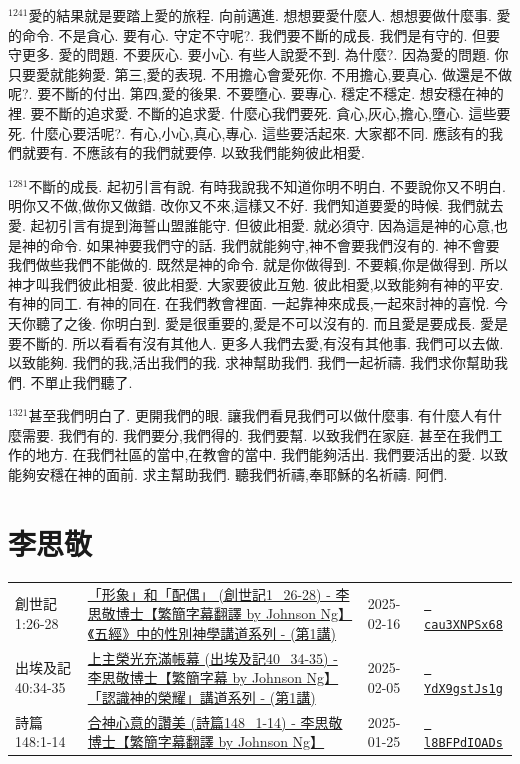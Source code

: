 \documentclass{book}
\begin{document}
$^{1241}$愛的結果就是要踏上愛的旅程.
向前邁進.
想想要愛什麼人.
想想要做什麼事.
愛的命令.
不是貪心.
要有心.
守定不守呢?.
我們要不斷的成長.
我們是有守的.
但要守更多.
愛的問題.
不要灰心.
要小心.
有些人說愛不到.
為什麼?.
因為愛的問題.
你只要愛就能夠愛.
第三,愛的表現.
不用擔心會愛死你.
不用擔心,要真心.
做還是不做呢?.
要不斷的付出.
第四,愛的後果.
不要墮心.
要專心.
穩定不穩定.
想安穩在神的裡.
要不斷的追求愛.
不斷的追求愛.
什麼心我們要死.
貪心,灰心,擔心,墮心.
這些要死.
什麼心要活呢?.
有心,小心,真心,專心.
這些要活起來.
大家都不同.
應該有的我們就要有.
不應該有的我們就要停.
以致我們能夠彼此相愛.

$^{1281}$不斷的成長.
起初引言有說.
有時我說我不知道你明不明白.
不要說你又不明白.
明你又不做,做你又做錯.
改你又不來,這樣又不好.
我們知道要愛的時候.
我們就去愛.
起初引言有提到海誓山盟誰能守.
但彼此相愛.
就必須守.
因為這是神的心意,也是神的命令.
如果神要我們守的話.
我們就能夠守,神不會要我們沒有的.
神不會要我們做些我們不能做的.
既然是神的命令.
就是你做得到.
不要賴,你是做得到.
所以神才叫我們彼此相愛.
彼此相愛.
大家要彼此互勉.
彼此相愛,以致能夠有神的平安.
有神的同工.
有神的同在.
在我們教會裡面.
一起靠神來成長,一起來討神的喜悅.
今天你聽了之後.
你明白到.
愛是很重要的,愛是不可以沒有的.
而且愛是要成長.
愛是要不斷的.
所以看看有沒有其他人.
更多人我們去愛,有沒有其他事.
我們可以去做.
以致能夠.
我們的我,活出我們的我.
求神幫助我們.
我們一起祈禱.
我們求你幫助我們.
不單止我們聽了.

$^{1321}$甚至我們明白了.
更開我們的眼.
讓我們看見我們可以做什麼事.
有什麼人有什麼需要.
我們有的.
我們要分,我們得的.
我們要幫.
以致我們在家庭.
甚至在我們工作的地方.
在我們社區的當中,在教會的當中.
我們能夠活出.
我們要活出的愛.
以致能夠安穩在神的面前.
求主幫助我們.
聽我們祈禱,奉耶穌的名祈禱.
阿們.
\newpage



\chapter{李思敬}\label{ch:preacher2}
\begin{multicols}{3}
\minitoc
\end{multicols}
{ \scriptsize


\begin{xltabular}{\textwidth}{|p{0.15\textwidth} p{0.6\textwidth}|p{0.07\textwidth} p{0.1\textwidth}|}
\hline
創世記 1:26-28 & \hyperref[sec:cau3XNPSx68]{「形象」和「配偶」 (創世記1\_26-28) - 李思敬博士【繁簡字幕翻譯 by Johnson Ng】《五經》中的性別神學講道系列 - (第1講)} & 2025-02-16 & \href{https://youtube.com/watch?v=cau3XNPSx68}{\texttt{ cau3XNPSx68}} \\
出埃及記 40:34-35 & \hyperref[sec:YdX9gstJs1g]{上主榮光充滿帳幕 (出埃及記40\_34-35) - 李思敬博士【繁簡字幕 by Johnson Ng】「認識神的榮耀」講道系列 - (第1講)} & 2025-02-05 & \href{https://youtube.com/watch?v=YdX9gstJs1g}{\texttt{ YdX9gstJs1g}} \\
詩篇 148:1-14 & \hyperref[sec:l8BFPdIOADs]{合神心意的讚美 (詩篇148\_1-14) - 李思敬博士【繁簡字幕翻譯 by Johnson Ng】} & 2025-01-25 & \href{https://youtube.com/watch?v=l8BFPdIOADs}{\texttt{ l8BFPdIOADs}} \\
\hline
\end{xltabular}
}
\newpage
\end{document}
